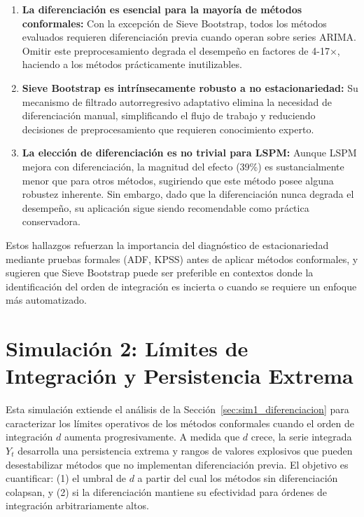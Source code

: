 \begin{enumerate}
\item \textbf{La diferenciación es esencial para la mayoría de métodos conformales:} Con la excepción de Sieve Bootstrap, todos los métodos evaluados requieren diferenciación previa cuando operan sobre series ARIMA. Omitir este preprocesamiento degrada el desempeño en factores de 4-17×, haciendo a los métodos prácticamente inutilizables.

\item \textbf{Sieve Bootstrap es intrínsecamente robusto a no estacionariedad:} Su mecanismo de filtrado autorregresivo adaptativo elimina la necesidad de diferenciación manual, simplificando el flujo de trabajo y reduciendo decisiones de preprocesamiento que requieren conocimiento experto.

\item \textbf{La elección de diferenciación es no trivial para LSPM:} Aunque LSPM mejora con diferenciación, la magnitud del efecto (39\%) es sustancialmente menor que para otros métodos, sugiriendo que este método posee alguna robustez inherente. Sin embargo, dado que la diferenciación nunca degrada el desempeño, su aplicación sigue siendo recomendable como práctica conservadora.
\end{enumerate}

Estos hallazgos refuerzan la importancia del diagnóstico de estacionariedad mediante pruebas formales (ADF, KPSS) antes de aplicar métodos conformales, y sugieren que Sieve Bootstrap puede ser preferible en contextos donde la identificación del orden de integración es incierta o cuando se requiere un enfoque más automatizado.


\section{Simulación 2: Límites de Integración y Persistencia Extrema}
\label{sec:sim2_multi_d}

Esta simulación extiende el análisis de la Sección~\ref{sec:sim1_diferenciacion} para caracterizar los límites operativos de los métodos conformales cuando el orden de integración $d$ aumenta progresivamente. A medida que $d$ crece, la serie integrada $Y_t$ desarrolla una persistencia extrema y rangos de valores explosivos que pueden desestabilizar métodos que no implementan diferenciación previa. El objetivo es cuantificar: (1) el umbral de $d$ a partir del cual los métodos sin diferenciación colapsan, y (2) si la diferenciación mantiene su efectividad para órdenes de integración arbitrariamente altos.

